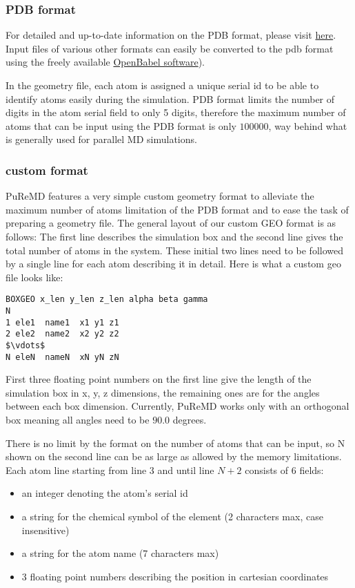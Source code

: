 \documentclass{article}
\begin{document}
\subsubsection{PDB format}
\label{sec:puremd_pdb}

For detailed and up-to-date information on the PDB format, please visit 
\href{http://www.wwpdb.org/docs.html}{here}. Input files of various other formats 
can easily be converted to the pdb format using the freely available 
\href{http://openbabel.sourceforge.net/wiki/Main_Page}{OpenBabel software}).

In the geometry file, each atom is assigned a unique serial id to be
able to identify atoms easily during the simulation. PDB format limits the 
number of digits in the atom serial field to only 5 digits, therefore the 
maximum number of atoms that can be input using the PDB format is only 
$100000$, way behind what is generally used for parallel MD simulations.

\subsubsection{custom format}
\label{sec:puremd_custom}

PuReMD features a very simple custom geometry format to alleviate the 
maximum number of atoms limitation of the PDB format and to ease the task of
preparing a geometry file. The general layout of our custom GEO format is as
follows: The first line describes the simulation box and the second line 
gives the total number of atoms in the system. These initial two lines need 
to be followed by a single line for each atom describing it in detail. 
Here is what a custom geo file looks like:
\begin{lstlisting}
BOXGEO x_len y_len z_len alpha beta gamma
N
1 ele1  name1  x1 y1 z1
2 ele2  name2  x2 y2 z2
$\vdots$
N eleN  nameN  xN yN zN 
\end{lstlisting}

First three floating point numbers on the first line give the length of 
the simulation box in x, y, z dimensions, the remaining ones are for the 
angles between each box dimension. Currently, PuReMD works only with an 
orthogonal box meaning all angles need to be $90.0$ degrees. 

There is no limit by the format on the number of atoms that can be input, 
so N shown on the second line can be as large as allowed by the memory
limitations. Each atom line starting from line 3 and until line $N+2$ consists 
of 6 fields: 
\begin{itemize}
  \item an integer denoting the atom's serial id
  \item a string for the chemical symbol of the element 
    (2 characters max, case insensitive)
  \item a string for the atom name (7 characters max)
  \item 3 floating point numbers describing the position in cartesian 
    coordinates
\end{itemize}
\end{document}
